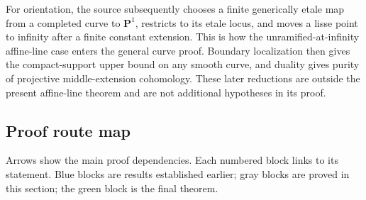\documentclass[11pt]{article}
\theoremstyle{plain}
\theoremstyle{definition}
\begin{document}
For orientation, the source subsequently chooses a finite generically
etale map from a completed curve to $\mathbf P^1$, restricts to its
etale locus, and moves a lisse point to infinity after a finite constant
extension. This is how the unramified-at-infinity affine-line case enters
the general curve proof. Boundary localization then gives the
compact-support upper bound on any smooth curve, and duality gives
purity of projective middle-extension cohomology. These later reductions
are outside the present affine-line theorem and are not additional
hypotheses in its proof.
\clearpage
\subsection*{Proof route map}
\label{sec:dl-a1-proof-map}
\noindent
Arrows show the main proof dependencies. Each numbered block links to its
statement. Blue blocks are results established earlier; gray blocks are
proved in this section; the green block is the final theorem.
\end{document}

